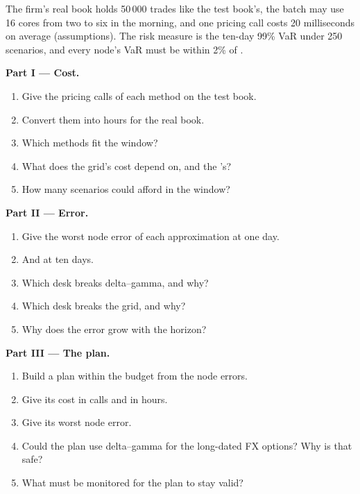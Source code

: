 \begin{problem}\label{pb:rc:build-a-risk-engine:1}
The firm's real book holds 50\,000 trades like the test book's, the batch may use 16 cores from two to six in
the morning, and one pricing call costs 20 milliseconds on average (assumptions). The risk measure is the
ten-day 99\% VaR under 250 scenarios, and every node's VaR must be within 2\% of .

\medskip\noindent\textbf{Part I --- Cost.}
\begin{enumerate}
\item Give the pricing calls of each method on the test book.
\item Convert them into hours for the real book.
\item Which methods fit the window?
\item What does the grid's cost depend on, and the 's?
\item How many scenarios could  afford in the window?
\end{enumerate}

\medskip\noindent\textbf{Part II --- Error.}
\begin{enumerate}[resume]
\item Give the worst node error of each approximation at one day.
\item And at ten days.
\item Which desk breaks delta--gamma, and why?
\item Which desk breaks the grid, and why?
\item Why does the error grow with the horizon?
\end{enumerate}

\medskip\noindent\textbf{Part III --- The plan.}
\begin{enumerate}[resume]
\item Build a plan within the budget from the node errors.
\item Give its cost in calls and in hours.
\item Give its worst node error.
\item Could the plan use delta--gamma for the long-dated FX options? Why is that safe?
\item What must be monitored for the plan to stay valid?
\end{enumerate}


\end{problem}
